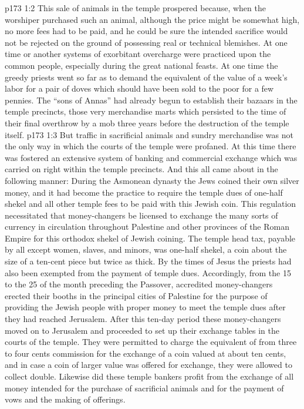 \vs p173 1:2 This sale of animals in the temple prospered because, when the worshiper purchased such an animal, although the price might be somewhat high, no more fees had to be paid, and he could be sure the intended sacrifice would not be rejected on the ground of possessing real or technical blemishes. At one time or another systems of exorbitant overcharge were practiced upon the common people, especially during the great national feasts. At one time the greedy priests went so far as to demand the equivalent of the value of a week’s labor for a pair of doves which should have been sold to the poor for a few pennies. The “sons of Annas” had already begun to establish their bazaars in the temple precincts, those very merchandise marts which persisted to the time of their final overthrow by a mob three years before the destruction of the temple itself.
\pc \vs p173 1:3 But traffic in sacrificial animals and sundry merchandise was not the only way in which the courts of the temple were profaned. At this time there was fostered an extensive system of banking and commercial exchange which was carried on right within the temple precincts. And this all came about in the following manner: During the Asmonean dynasty the Jews coined their own silver money, and it had become the practice to require the temple dues of one\hyp{}half shekel and all other temple fees to be paid with this Jewish coin. This regulation necessitated that money\hyp{}changers be licensed to exchange the many sorts of currency in circulation throughout Palestine and other provinces of the Roman Empire for this orthodox shekel of Jewish coining. The temple head tax, payable by all except women, slaves, and minors, was one\hyp{}half shekel, a coin about the size of a ten\hyp{}cent piece but twice as thick. By the times of Jesus the priests had also been exempted from the payment of temple dues. Accordingly, from the 15 to the 25 of the month preceding the Passover, accredited money\hyp{}changers erected their booths in the principal cities of Palestine for the purpose of providing the Jewish people with proper money to meet the temple dues after they had reached Jerusalem. After this ten\hyp{}day period these money\hyp{}changers moved on to Jerusalem and proceeded to set up their exchange tables in the courts of the temple. They were permitted to charge the equivalent of from three to four cents commission for the exchange of a coin valued at about ten cents, and in case a coin of larger value was offered for exchange, they were allowed to collect double. Likewise did these temple bankers profit from the exchange of all money intended for the purchase of sacrificial animals and for the payment of vows and the making of offerings.
